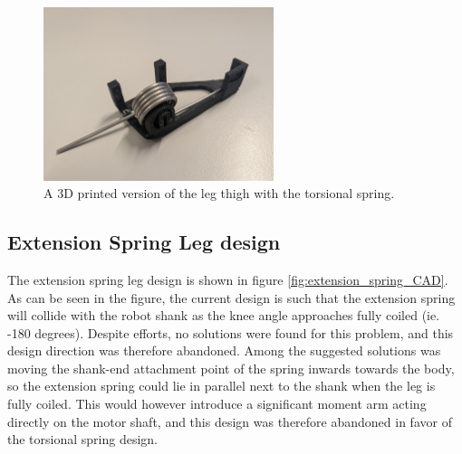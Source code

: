 \begin{figure}[h!]
    \centering
    \includegraphics[width=0.6\textwidth]{Images/printed_leg_and_spring.jpg}
    \caption{A 3D printed version of the leg thigh with the torsional spring.}
    \label{fig:printed_leg_and_spring}
\end{figure}

\subsection{Extension Spring Leg design}
\label{sec:extension_spring_design}

The extension spring leg design is shown in figure \ref{fig:extension_spring_CAD}. As can be seen in the figure, the current design is such that the extension spring will collide with the robot shank as the knee angle approaches fully coiled (ie. -180 degrees). Despite efforts, no solutions were found for this problem, and this design direction was therefore abandoned. Among the suggested solutions was moving the shank-end attachment point of the spring inwards towards the body, so the extension spring could lie in parallel next to the shank when the leg is fully coiled. This would however introduce a significant moment arm acting directly on the motor shaft, and this design was therefore abandoned in favor of the torsional spring design.

